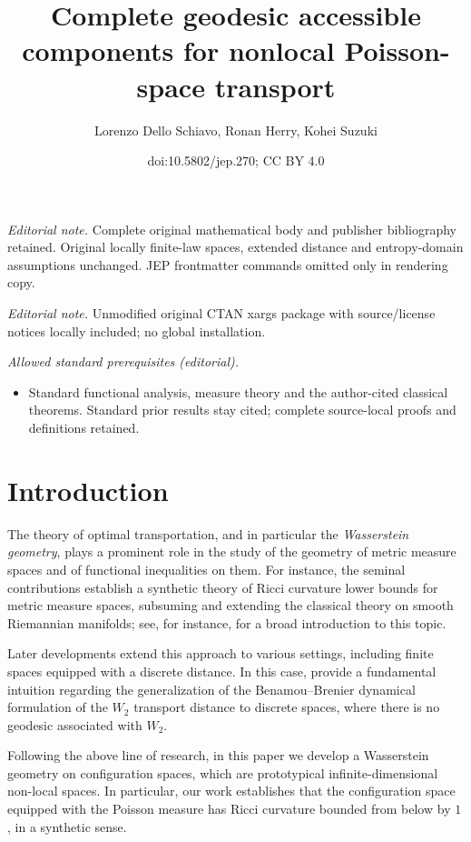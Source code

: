 \documentclass[10pt]{amsart}
\title{Complete geodesic accessible components for nonlocal Poisson-space transport}
\author{Lorenzo Dello Schiavo, Ronan Herry, Kohei Suzuki}
\date{doi:10.5802/jep.270; CC BY 4.0}
\theoremstyle{definition}
\theoremstyle{remark}
\begin{document}
\maketitle
\noindent\textit{Editorial note.} Complete original mathematical body and publisher bibliography retained. Original locally finite-law spaces, extended distance and entropy-domain assumptions unchanged. JEP frontmatter commands omitted only in rendering copy.\par\medskip
\noindent\textit{Editorial note.} Unmodified original CTAN xargs package with source/license notices locally included; no global installation.\par\medskip
\noindent\textit{Allowed standard prerequisites (editorial).}\begin{itemize}
\item Standard functional analysis, measure theory and the author-cited classical theorems. Standard prior results stay cited; complete source-local proofs and definitions retained.
\end{itemize}\medskip
\tableofcontents


\vspace*{-2.5\baselineskip}\enlargethispage{.5\baselineskip}\mbox{}
\section{Introduction}
The theory of optimal transportation, and in particular the \emph{Wasserstein geometry}, plays a prominent role in the study of the geometry of metric measure spaces and of functional inequalities on them.
For instance, the seminal contributions \cite{Sturm,LottVillani,AGSDuke} establish a synthetic theory of Ricci curvature lower bounds for metric measure spaces, subsuming and extending the classical theory on smooth Riemannian manifolds; see, for instance, \cite[Part\,III]{VillaniOldAndNew} for a broad introduction to this topic.

Later developments extend this approach to various settings, including finite spaces equipped with a discrete distance.
In this case, \cite{Maas,Mielke} provide a fundamental intuition regarding the generalization of the Benamou--Brenier dynamical formulation of the $W_{2}$ transport distance to discrete spaces, where there is no geodesic associated with $W_{2}$.

Following the above line of research, in this paper we develop a Wasserstein geom\-etry on configuration spaces, which are prototypical infinite-dimensional non-local spaces.
In particular, our work establishes that the configuration space equipped with the Poisson measure has Ricci curvature bounded from below by $1$, in a synthetic sense.
\end{document}
